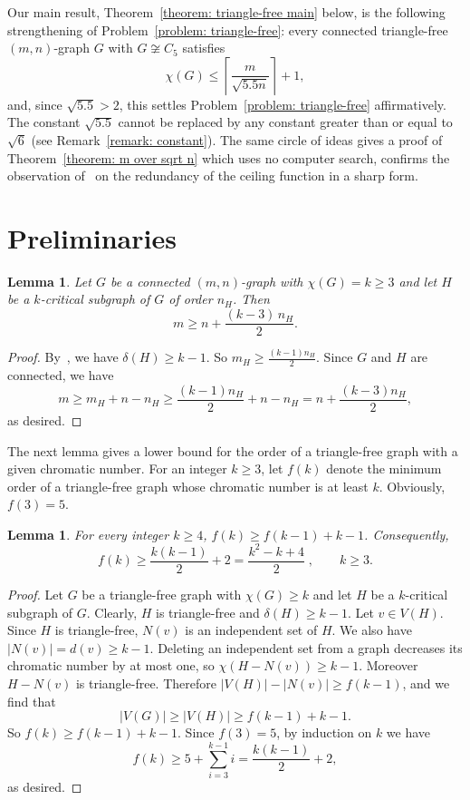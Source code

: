 \documentclass{amsart}
\theoremstyle{plain}
\newtheorem{lemma}[theorem]{Lemma}
\begin{document}
Our main result, Theorem~\ref{theorem: triangle-free main} below, is the following strengthening of Problem~\ref{problem: triangle-free}: every connected triangle-free $(m,n)$-graph $G$ with $G \not\cong C_5$ satisfies
$$\chi(G) \leq \left\lceil \frac{m}{\sqrt{5.5n}} \right\rceil + 1,$$
and, since $\sqrt{5.5} > 2$, this settles Problem~\ref{problem: triangle-free} affirmatively. The constant $\sqrt{5.5}$ cannot be replaced by any constant greater than or equal to $\sqrt{6}$ (see Remark~\ref{remark: constant}). The same circle of ideas gives a proof of Theorem~\ref{theorem: m over sqrt n} which uses no computer search, confirms the observation of~\cite{akbari2026some} on the redundancy of the ceiling function in a sharp form.

\section{Preliminaries} \label{section: preliminaries}


\begin{lemma} \label{lemma: density}
Let $G$ be a connected $(m,n)$-graph with $\chi(G) = k \geq 3$ and let $H$ be a $k$-critical subgraph of $G$ of order $n_H$. Then
$$m \geq n + \frac{(k-3)\,n_H}{2}.$$
\end{lemma}

\begin{proof}
By~\cite[p.~194]{west2001introduction}, we have $\delta(H) \geq k-1$. So $m_H \geq \frac{(k-1)n_H}{2}$. Since $G$ and $H$ are connected, we have
$$m \geq m_H + n - n_H \geq \frac{(k-1)n_H}{2} + n - n_H = n + \frac{(k-3)n_H}{2},$$
as desired.
\end{proof}

The next lemma gives a lower bound for the order of a triangle-free graph with a given chromatic number. For an integer $k \geq 3$, let $f(k)$ denote the minimum order of a triangle-free graph whose chromatic number is at least $k$. Obviously, $f(3) = 5$.

\begin{lemma} \label{lemma: f(k)}
For every integer $k \geq 4$, $f(k) \geq f(k-1) + k - 1$. Consequently,
$$f(k) \geq \frac{k(k-1)}{2} + 2 = \frac{k^2-k+4}{2} \; , \qquad k \geq 3.$$
\end{lemma}

\begin{proof}
Let $G$ be a triangle-free graph with $\chi(G) \geq k$ and let $H$ be a $k$-critical subgraph of $G$. Clearly, $H$ is triangle-free and $\delta(H) \geq k-1$. Let $v \in V(H)$. Since $H$ is triangle-free, $N(v)$ is an independent set of $H$. We also have $|N(v)| = d(v) \geq k-1$. Deleting an independent set from a graph decreases its chromatic number by at most one, so $\chi(H - N(v)) \geq k-1$. Moreover $H - N(v)$ is triangle-free. Therefore $|V(H)| - |N(v)| \geq f(k-1)$, and we find that
$$|V(G)| \geq |V(H)| \geq f(k-1) + k - 1.$$
So $f(k) \geq f(k-1)+k-1$. Since $f(3) = 5$, by induction on $k$ we have
$$f(k) \geq 5 + \sum_{i=3}^{k-1} i = \frac{k(k-1)}{2} + 2,$$
as desired.
\end{proof}
\end{document}

